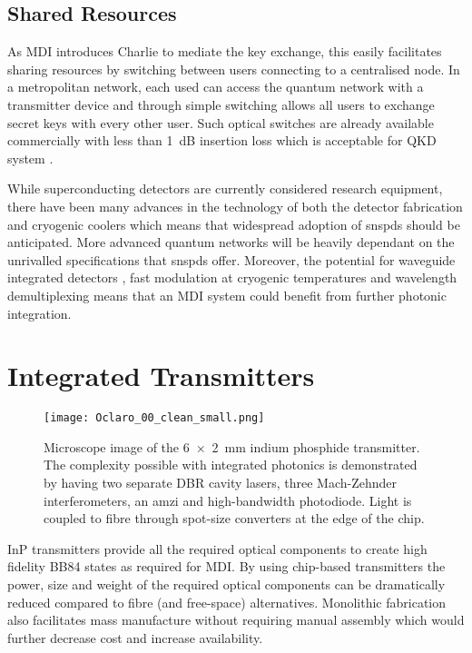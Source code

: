 \subsection{Shared Resources}

As \ac{MDI} introduces Charlie to mediate the key exchange, this easily facilitates sharing resources by switching between users connecting to a centralised node. In a metropolitan network, each used can access the quantum network with a transmitter device and through simple switching allows all users to exchange secret keys with every other user. Such optical switches are already available commercially with less than \SI{1}{dB} insertion loss which is acceptable for \ac{QKD} system \cite{polatis}. 

While superconducting detectors are currently considered research equipment, there have been many advances in the technology of both the detector fabrication and cryogenic coolers which means that widespread adoption of \acp{snspd} should be anticipated. More advanced quantum networks will be heavily dependant on the unrivalled specifications that \acp{snspd} offer. Moreover, the potential for waveguide integrated detectors \cite{sprengers2011, vetter2016, yun2019}, fast modulation at cryogenic temperatures \cite{eltes2019} and wavelength demultiplexing \cite{sugita2000} means that an \ac{MDI} system could benefit from further photonic integration. 

\section{Integrated Transmitters}

\begin{figure}[tbp]
	\centering
	\texttt{[image: Oclaro\_00\_clean\_small.png]}
	\caption[Microscope image of the InP QKD transmitter devices]{Microscope image of the \SI{6x2}{mm} indium phosphide transmitter. The complexity possible with integrated photonics is demonstrated by having two separate DBR cavity lasers, three Mach-Zehnder interferometers, an \ac{amzi} and high-bandwidth photodiode. Light is coupled to fibre through spot-size converters at the edge of the chip.}
	\label{fig:oclaro_00}
\end{figure}

\Ac{InP} transmitters provide all the required optical components to create high fidelity BB84 states as required for \ac{MDI}. By using chip-based transmitters the power, size and weight of the required optical components can be dramatically reduced compared to fibre (and free-space) alternatives. Monolithic fabrication also facilitates mass manufacture without requiring manual assembly which would further decrease cost and increase availability.

